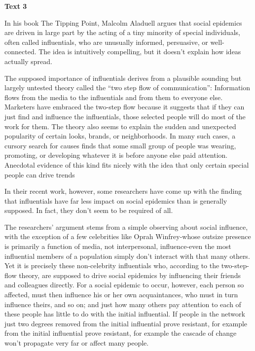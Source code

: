 \begin{center}\textbf{Text 3}\end{center}

\qquad In his book The Tipping Point, Malcolm Aladuell argues that social epidemics are driven in large part by the acting of a tiny minority of special individuals, often called influentials, who are unusually informed, persuasive, or well-connected. The idea is intuitively compelling, but it doesn't explain how ideas actually spread.

\qquad The supposed importance of influentials derives from a plausible sounding but largely untested theory called the ``two step flow of communication'': Information flows from the media to the influentials and from them to everyone else. Marketers have embraced the two-step flow because it suggests that if they can just find and influence the influentials, those selected people will do most of the work for them. The theory also seems to explain the sudden and unexpected popularity of certain looks, brands, or neighborhoods. In many such cases, a cursory search for causes finds that some small group of people was wearing, promoting, or developing whatever it is before anyone else paid attention. Anecdotal evidence of this kind fits nicely with the idea that only certain special people can drive trends

\qquad In their recent work, however, some researchers have come up with the finding that influentials have far less impact on social epidemics than is generally supposed. In fact, they don't seem to be required of all.

\qquad The researchers' argument stems from a simple observing about social influence, with the exception of a few celebrities like Oprah Winfrey-whose outsize presence is primarily a function of media, not interpersonal, influence-even the most influential members of a population simply don't interact with that many others. Yet it is precisely these non-celebrity influentials who, according to the two-step-flow theory, are supposed to drive social epidemics by influencing their friends and colleagues directly. For a social epidemic to occur, however, each person so affected, must then influence his or her own acquaintances, who must in turn influence theirs, and so on; and just how many others pay attention to each of these people has little to do with the initial influential. If people in the network just two degrees removed from the initial influential prove resistant, for example from the initial influential prove resistant, for example the cascade of change won't propagate very far or affect many people.

